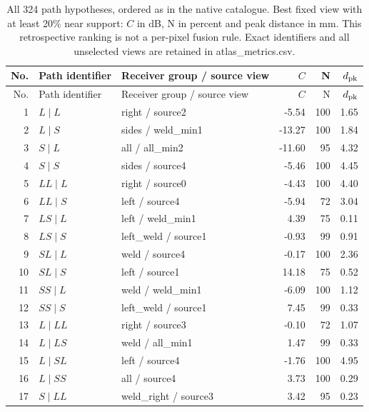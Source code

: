 \begingroup\small\setlength{\tabcolsep}{3pt}
\begin{longtable}{@{}r>{\raggedright\arraybackslash}p{.28\linewidth}>{\raggedright\arraybackslash}p{.27\linewidth}rrr@{}}
\caption{All 324 path hypotheses, ordered as in the native catalogue. Best fixed view with at least 20\% near support: $C$ in dB, N in percent and peak distance in mm. This retrospective ranking is not a per-pixel fusion rule. Exact identifiers and all unselected views are retained in atlas\_metrics.csv.}\label{saftapp:path_register}\\
\toprule No. & Path identifier & Receiver group / source view & $C$ & N & $d_{\rm pk}$\\\midrule\endfirsthead
\toprule No. & Path identifier & Receiver group / source view & $C$ & N & $d_{\rm pk}$\\\midrule\endhead
1 & $L\mid L$ & right / source2 & -5.54 & 100 & 1.65\\
2 & $L\mid S$ & sides / weld\_\allowbreak min1 & -13.27 & 100 & 1.84\\
3 & $S\mid L$ & all / all\_\allowbreak min2 & -11.60 & 95 & 4.32\\
4 & $S\mid S$ & sides / source4 & -5.46 & 100 & 4.45\\
5 & $LL\mid L$ & right / source0 & -4.43 & 100 & 4.40\\
6 & $LL\mid S$ & left / source4 & -5.94 & 72 & 3.04\\
7 & $LS\mid L$ & left / weld\_\allowbreak min1 & 4.39 & 75 & 0.11\\
8 & $LS\mid S$ & left\_\allowbreak weld / source1 & -0.93 & 99 & 0.91\\
9 & $SL\mid L$ & weld / source4 & -0.17 & 100 & 2.36\\
10 & $SL\mid S$ & left / source1 & 14.18 & 75 & 0.52\\
11 & $SS\mid L$ & weld / weld\_\allowbreak min1 & -6.09 & 100 & 1.12\\
12 & $SS\mid S$ & left\_\allowbreak weld / source1 & 7.45 & 99 & 0.33\\
13 & $L\mid LL$ & right / source3 & -0.10 & 72 & 1.07\\
14 & $L\mid LS$ & weld / all\_\allowbreak min1 & 1.47 & 99 & 0.33\\
15 & $L\mid SL$ & left / source4 & -1.76 & 100 & 4.95\\
16 & $L\mid SS$ & all / source4 & 3.73 & 100 & 0.29\\
17 & $S\mid LL$ & weld\_\allowbreak right / source3 & 3.42 & 95 & 0.23\\

\end{longtable}

